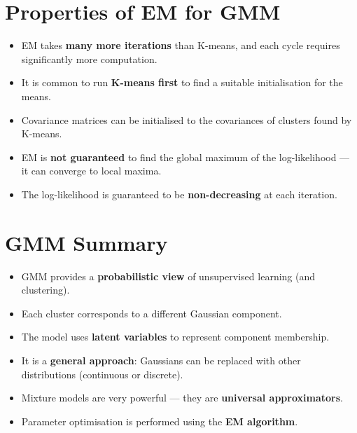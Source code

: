 \documentclass[11pt,a4paper]{article}
\theoremstyle{definition}
\theoremstyle{plain}
\theoremstyle{remark}
\begin{document}
\section{Properties of EM for GMM}

\begin{tcolorbox}[colback=purple!5!white,colframe=purple!75!black,title=\textbf{Key Properties of EM}]
\begin{itemize}
    \item EM takes \textbf{many more iterations} than K-means, and each cycle requires significantly more computation.
    \item It is common to run \textbf{K-means first} to find a suitable initialisation for the means.
    \item Covariance matrices can be initialised to the covariances of clusters found by K-means.
    \item EM is \textbf{not guaranteed} to find the global maximum of the log-likelihood --- it can converge to local maxima.
    \item The log-likelihood is guaranteed to be \textbf{non-decreasing} at each iteration.
\end{itemize}
\end{tcolorbox}

\section{GMM Summary}

\begin{tcolorbox}[colback=blue!5!white,colframe=blue!75!black,title=\textbf{GMM Summary}]
\begin{itemize}
    \item GMM provides a \textbf{probabilistic view} of unsupervised learning (and clustering).
    \item Each cluster corresponds to a different Gaussian component.
    \item The model uses \textbf{latent variables} to represent component membership.
    \item It is a \textbf{general approach}: Gaussians can be replaced with other distributions (continuous or discrete).
    \item Mixture models are very powerful --- they are \textbf{universal approximators}.
    \item Parameter optimisation is performed using the \textbf{EM algorithm}.
\end{itemize}
\end{tcolorbox}
\end{document}
